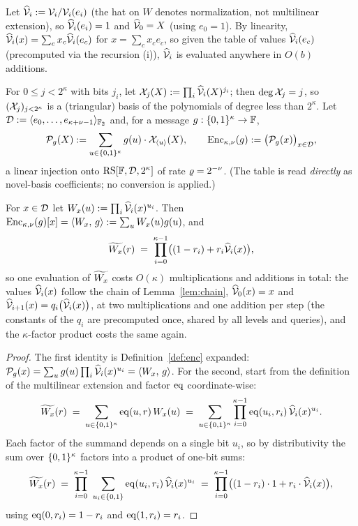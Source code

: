 Let $\widehat{\mathcal{V}}_{i} := \mathcal{V}_i / \mathcal{V}_i(e_i)$ (the hat on $W$ denotes normalization, not multilinear extension), so $\widehat{\mathcal{V}}_{i}(e_i) = 1$ and $\widehat{\mathcal{V}}_{0} = X$ (using $e_0 = 1$). By linearity, $\widehat{\mathcal{V}}_{i}(x) = \sum_c x_c \widehat{\mathcal{V}}_{i}(e_c)$ for $x = \sum_c x_c e_c$, so given the table of values $\widehat{\mathcal{V}}_{i}(e_c)$ (precomputed via the recursion (i)), $\widehat{\mathcal{V}}_{i}$ is evaluated anywhere in $O(b)$ additions.

\begin{definition}\label{def:enc}
For $0 \le j < 2^{\kappa}$ with bits $j_i$, let $\mathcal{X}_j(X) := \prod_i \widehat{\mathcal{V}}_{i}(X)^{j_i}$; then $\deg \mathcal{X}_j = j$, so $(\mathcal{X}_j)_{j < 2^\kappa}$ is a (triangular) basis of the polynomials of degree less than $2^{\kappa}$. Let $\mathcal{D} := \langle e_0, \dots, e_{\kappa+\nu-1} \rangle_{\mathbb{F}_2}$ and, for a message $g : \{0,1\}^{\kappa} \to \mathbb{F}$,
\[
\mathcal{P}_g(X) := \sum_{u \in \{0,1\}^{\kappa}} g(u) \cdot \mathcal{X}_{\langle u \rangle}(X), \qquad \mathrm{Enc}_{\kappa,\nu}(g) := \bigl(\mathcal{P}_g(x)\bigr)_{x \in \mathcal{D}},
\]
a linear injection onto $\mathrm{RS}[\mathbb{F}, \mathcal{D}, 2^{\kappa}]$ of rate $\varrho = 2^{-\nu}$. (The table is read \emph{directly} as novel-basis coefficients; no conversion is applied.)
\end{definition}

\begin{lemma}\label{lem:colweight}
For $x \in \mathcal{D}$ let $W_x(u) := \prod_i \widehat{\mathcal{V}}_{i}(x)^{u_i}$. Then $\mathrm{Enc}_{\kappa,\nu}(g)[x] = \langle W_x,\, g \rangle := \sum_u W_x(u) g(u)$, and
\[
\widetilde{W_x}(r) \;=\; \prod_{i=0}^{\kappa-1} \bigl( (1-r_i) + r_i \widehat{\mathcal{V}}_{i}(x) \bigr),
\]
so one evaluation of $\widetilde{W_x}$ costs $O(\kappa)$ multiplications and additions in total: the values $\widehat{\mathcal{V}}_{i}(x)$ follow the chain of Lemma~\ref{lem:chain}, $\widehat{\mathcal{V}}_{0}(x) = x$ and $\widehat{\mathcal{V}}_{i+1}(x) = q_i\bigl(\widehat{\mathcal{V}}_{i}(x)\bigr)$, at two multiplications and one addition per step (the constants of the $q_i$ are precomputed once, shared by all levels and queries), and the $\kappa$-factor product costs the same again.
\end{lemma}

\begin{proof}
The first identity is Definition~\ref{def:enc} expanded: $\mathcal{P}_g(x) = \sum_u g(u) \prod_i \widehat{\mathcal{V}}_{i}(x)^{u_i} = \langle W_x,\, g \rangle$. For the second, start from the definition of the multilinear extension and factor $\operatorname{eq}$ coordinate-wise:
\[
\widetilde{W_x}(r) \;=\; \sum_{u \in \{0,1\}^{\kappa}} \operatorname{eq}(u, r)\, W_x(u) \;=\; \sum_{u \in \{0,1\}^{\kappa}} \prod_{i=0}^{\kappa-1} \operatorname{eq}(u_i, r_i)\, \widehat{\mathcal{V}}_{i}(x)^{u_i} .
\]
Each factor of the summand depends on a single bit $u_i$, so by distributivity the sum over $\{0,1\}^{\kappa}$ factors into a product of one-bit sums:
\[
\widetilde{W_x}(r) \;=\; \prod_{i=0}^{\kappa-1} \; \sum_{u_i \in \{0,1\}} \operatorname{eq}(u_i, r_i)\, \widehat{\mathcal{V}}_{i}(x)^{u_i} \;=\; \prod_{i=0}^{\kappa-1} \bigl( (1-r_i) \cdot 1 + r_i \cdot \widehat{\mathcal{V}}_{i}(x) \bigr),
\]
using $\operatorname{eq}(0, r_i) = 1 - r_i$ and $\operatorname{eq}(1, r_i) = r_i$.
\end{proof}

